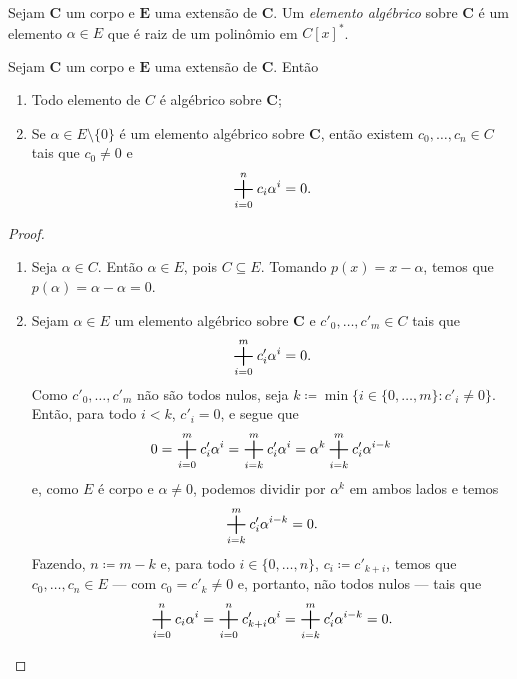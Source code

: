 \begin{defi}
	Sejam $\bm C$ um corpo e $\bm E$ uma extensão de $\bm C$. Um \emph{elemento algébrico} sobre $\bm C$ é um elemento $\alpha \in E$ que é raiz de um polinômio em $C[x]^*$.
\end{defi}

\begin{prop}
	Sejam $\bm C$ um corpo e $\bm E$ uma extensão de $\bm C$. Então
	\begin{enumerate}
	\item Todo elemento de $C$ é algébrico sobre $\bm C$;
	\item Se $\alpha \in E \setminus \{0\}$ é um elemento algébrico sobre $\bm C$, então existem $c_0,\ldots,c_n \in C$ tais que $c_0 \neq 0$ e
	\begin{equation*}
	\bigsum_{i=0}^n c_i\alpha^i = 0.
	\end{equation*}
	\end{enumerate}
\end{prop}
\begin{proof}
	\begin{enumerate}
	\item Seja $\alpha \in C$. Então $\alpha \in E$, pois $C \subseteq E$. Tomando $p(x)=x-\alpha$, temos que $p(\alpha)=\alpha-\alpha=0$.
	\item Sejam $\alpha \in E$ um elemento algébrico sobre $\bm C$ e $c'_0,\ldots,c'_m \in C$ tais que
	\begin{equation*}
	\bigsum_{i=0}^m c'_i\alpha^i = 0.
	\end{equation*}
Como $c'_0, \ldots,c'_m$ não são todos nulos, seja $k \coloneqq \min\{i \in \{0,\ldots,m\} : c'_i \neq 0\}$. Então, para todo $i < k$, $c'_i = 0$, e segue que
	\begin{equation*}
	0 = \bigsum_{i=0}^m c'_i\alpha^i = \bigsum_{i=k}^m c'_i\alpha^i = \alpha^k \bigsum_{i=k}^m c'_i\alpha^{i-k}
	\end{equation*}
e, como $E$ é corpo e $\alpha \neq 0$, podemos dividir por $\alpha^k$ em ambos lados e temos
	\begin{equation*}
	\bigsum_{i=k}^m c'_i\alpha^{i-k} = 0.
	\end{equation*}
Fazendo, $n \coloneqq m-k$ e, para todo $i \in \{0,\ldots,n\}$, $c_i \coloneqq c'_{k+i}$, temos que $c_0,\ldots,c_n \in E$ — com $c_0 = c'_k \neq 0$ e, portanto, não todos nulos — tais que
	\begin{equation*}
	\bigsum_{i=0}^n c_i\alpha^i = \bigsum_{i=0}^n c'_{k+i}\alpha^i = \bigsum_{i=k}^m c'_i\alpha^{i-k} = 0.
	\end{equation*}
	\end{enumerate}
\end{proof}

